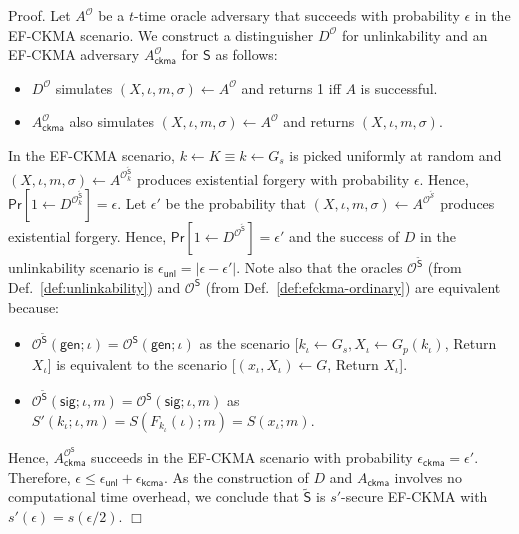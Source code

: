 \documentclass{article}
\newenvironment{proof}{\textsf{Proof}.}{\hfill$\Box$}
\begin{document}
\begin{proof}
Let $A^\mathcal{O}$ be a $t$-time oracle adversary that succeeds with probability $\epsilon$ in the EF-CKMA scenario. We construct a distinguisher $D^\mathcal{O}$ for unlinkability and an EF-CKMA adversary $A^\mathcal{O}_\mathsf{ckma}$ for $\mathsf{S}$ as follows:
\begin{itemize}
\item $D^\mathcal{O}$ simulates $(X,\iota,m,\sigma)\gets A^{\mathcal{O}}$ and returns 1 iff $A$ is successful.
\item $A_\mathsf{ckma}^\mathcal{O}$ also simulates $(X,\iota,m,\sigma)\gets A^{\mathcal{O}}$ and returns $(X,\iota,m,\sigma)$.
\end{itemize}
In the EF-CKMA scenario, $k\gets K \equiv k\gets G_s$ is picked uniformly at random and $(X,\iota,m,\sigma)\gets A^{\mathcal{O}^{\tilde{\mathsf{S}}}_k}$ produces existential forgery with probability $\epsilon$. Hence, $\mathsf{Pr}[1\gets D^{\mathcal{O}^{\tilde{\mathsf{S}}}_k}]=\epsilon$. Let $\epsilon'$ be the probability that $(X,\iota,m,\sigma)\gets A^{\mathcal{O}^{\tilde{\mathcal{S}}}}$
produces existential forgery. Hence,
$\mathsf{Pr}[1\gets D^{\mathcal{O}^{\tilde{\mathsf{S}}}}]=\epsilon'$
and the success of $D$ in the unlinkability scenario is $\epsilon_\mathsf{unl}=|\epsilon-\epsilon'|$.
Note also that the oracles $\mathcal{O}^{\tilde{\mathsf{S}}}$ (from Def.~\ref{def:unlinkability}) and $\mathcal{O}^{\mathsf{S}}$ (from Def.~\ref{def:efckma-ordinary}) are equivalent because:
\begin{itemize}
\item $\mathcal{O}^{\tilde{\mathsf{S}}}(\mathsf{gen};\iota) = \mathcal{O}^{\mathsf{S}}(\mathsf{gen};\iota)$ as the scenario
[$k_\iota \gets G_s, X_\iota \gets G_p(k_\iota)$, Return $X_\iota$]
is equivalent to the scenario
[$(x_\iota, X_\iota)\gets G$, Return $X_\iota$].
\item $\mathcal{O}^{\tilde{\mathsf{S}}}(\mathsf{sig};\iota,m) = \mathcal{O}^{\mathsf{S}}(\mathsf{sig};\iota,m)$ as $S'(k_\iota;\iota,m)=S(F_{k_\iota}(\iota);m)=S(x_\iota;m)$.
\end{itemize}
Hence, $A_\mathsf{ckma}^{\mathcal{O}^\mathsf{S}}$
succeeds in the EF-CKMA scenario with probability $\epsilon_\mathsf{ckma}=\epsilon'$.
Therefore, $\epsilon \le \epsilon_\mathsf{unl}+ \epsilon_\mathsf{kcma}$. As the construction of $D$ and $A_\mathsf{ckma}$ involves no computational time overhead, we conclude that
$\tilde{\mathsf{S}}$ is $s'$-secure EF-CKMA with $s'(\epsilon) = s(\epsilon/2)$.
\end{proof}
\end{document}
